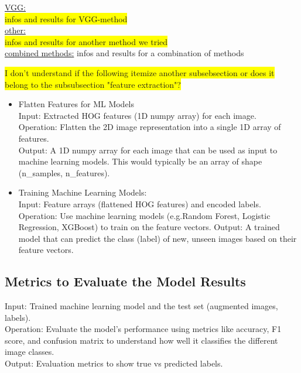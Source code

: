 \documentclass{article}
\begin{document}
\vspace{0.5cm}
    

\underline{VGG:}\\
\colorbox{yellow}{infos and results for VGG-method}
\\

\underline{other:}\\
\colorbox{yellow}{infos and results for another method we tried}
\\

\underline{combined methods:}
infos and results for a combination of methods

\colorbox{yellow}{I don't understand if the following itemize another subsebsection or does it belong to the subsubsection "feature extraction"?}
\begin{itemize}
    \item Flatten Features for ML Models\\
    Input: Extracted HOG features (1D numpy array) for each image.\\
    Operation: Flatten the 2D image representation into a single 1D array of features.\\
    Output: A 1D numpy array for each image that can be used as input to machine learning models. This would typically be an array of shape (n\_samples, n\_features).\\
    \item Training Machine Learning Models:\\
    Input: Feature arrays (flattened HOG features) and encoded labels.
    Operation: Use machine learning models (e.g.Random Forest, Logistic Regression, XGBoost) to train on the feature vectors.
    Output: A trained model that can predict the class (label) of new, unseen images based on their feature vectors.
\end{itemize}


\subsection{Metrics to Evaluate the Model Results} \label{metrics_ML}
Input: Trained machine learning model and the test set (augmented images, labels).\\
Operation: Evaluate the model's performance using metrics like accuracy, F1 score, and confusion matrix to understand how well it classifies the different 
image classes.\\
Output: Evaluation metrics to show true vs predicted labels.
\end{document}
